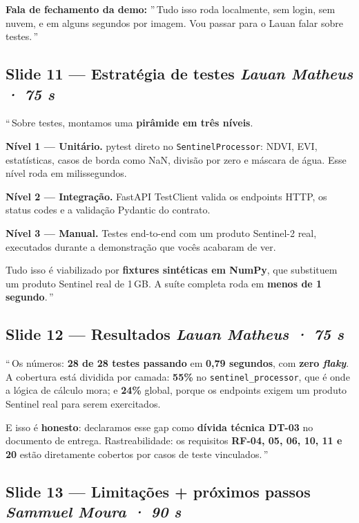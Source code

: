 \documentclass[12pt,a4paper]{article}
\begin{document}
\textbf{Fala de fechamento da demo:} \textquotedblright\,Tudo isso roda
localmente, sem login, sem nuvem, e em alguns segundos por imagem.
Vou passar para o Lauan falar sobre testes.\,\textquotedblright

\subsection*{Slide 11 — Estratégia de testes \hfill \textit{Lauan Matheus · 75 s}}

\textquotedblleft\,Sobre testes, montamos uma \textbf{pirâmide em três
níveis}.

\textbf{Nível 1 — Unitário.} pytest direto no
\texttt{SentinelProcessor}: NDVI, EVI, estatísticas, casos de borda
como NaN, divisão por zero e máscara de água. Esse nível roda em
milissegundos.

\textbf{Nível 2 — Integração.} FastAPI TestClient valida os endpoints
HTTP, os status codes e a validação Pydantic do contrato.

\textbf{Nível 3 — Manual.} Testes end-to-end com um produto Sentinel-2
real, executados durante a demonstração que vocês acabaram de ver.

Tudo isso é viabilizado por \textbf{fixtures sintéticas em NumPy}, que
substituem um produto Sentinel real de 1\,GB. A suíte completa roda em
\textbf{menos de 1 segundo}.\,\textquotedblright

\subsection*{Slide 12 — Resultados \hfill \textit{Lauan Matheus · 75 s}}

\textquotedblleft\,Os números: \textbf{28 de 28 testes passando} em
\textbf{0,79 segundos}, com \textbf{zero \textit{flaky}}. A cobertura
está dividida por camada: \textbf{55\%} no
\texttt{sentinel\_processor}, que é onde a lógica de cálculo mora;
e \textbf{24\%} global, porque os endpoints exigem um produto
Sentinel real para serem exercitados.

E isso é \textbf{honesto}: declaramos esse gap como
\textbf{dívida técnica DT-03} no documento de entrega.
Rastreabilidade: os requisitos \textbf{RF-04, 05, 06, 10, 11 e 20}
estão diretamente cobertos por casos de teste vinculados.\,\textquotedblright

\subsection*{Slide 13 — Limitações + próximos passos \hfill \textit{Sammuel Moura · 90 s}}
\end{document}
